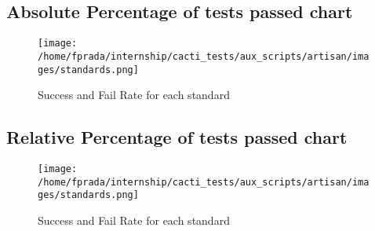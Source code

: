 \documentclass{article}
\begin{document}
\subsection{Absolute Percentage of tests passed chart}
\begin{figure}[h!]
\centering
\texttt{[image: /home/fprada/internship/cacti\_tests/aux\_scripts/artisan/images/standards.png]}
\caption{Success and Fail Rate for each standard}
\label{fig:standards}
\end{figure}
\subsection{Relative Percentage of tests passed chart}
\begin{figure}[h!]
\centering
\texttt{[image: /home/fprada/internship/cacti\_tests/aux\_scripts/artisan/images/standards.png]}
\caption{Success and Fail Rate for each standard}
\label{fig:standards}
\end{figure}
\end{document}
